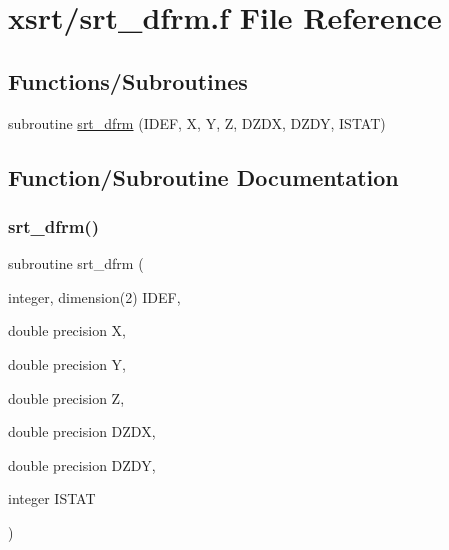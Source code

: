 \hypertarget{srt__dfrm_8f}{}\section{xsrt/srt\+\_\+dfrm.f File Reference}
\label{srt__dfrm_8f}
\subsection*{Functions/\+Subroutines}
\begin{DoxyCompactItemize}
\item 
subroutine \hyperlink{srt__dfrm_8f_a3e519d6ee27d5a9ba12b8e847b4620ae}{srt\+\_\+dfrm} (I\+D\+EF, X, Y, Z, D\+Z\+DX, D\+Z\+DY, I\+S\+T\+AT)
\end{DoxyCompactItemize}


\subsection{Function/\+Subroutine Documentation}
\mbox{\label{srt__dfrm_8f_a3e519d6ee27d5a9ba12b8e847b4620ae}} 
\subsubsection{\texorpdfstring{srt\+\_\+dfrm()}{srt\_dfrm()}}
{\footnotesize\ttfamily subroutine srt\+\_\+dfrm (\begin{DoxyParamCaption}\item[{integer, dimension(2)}]{I\+D\+EF,  }\item[{double precision}]{X,  }\item[{double precision}]{Y,  }\item[{double precision}]{Z,  }\item[{double precision}]{D\+Z\+DX,  }\item[{double precision}]{D\+Z\+DY,  }\item[{integer}]{I\+S\+T\+AT }\end{DoxyParamCaption})}

